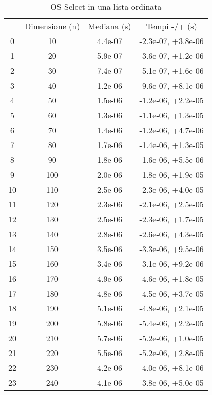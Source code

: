 \begin{table}
\centering
\caption{OS-Select in una lista ordinata}
\label{OS-Select in una lista ordinata}
\begin{adjustbox}{width=1\textwidth/2}
\begin{tabular}{|c|c|c|c|}
\hline
 & Dimensione (n) & Mediana (s) & Tempi -/+ (s) \\
0 & 10 & 4.4e-07 & -2.3e-07, +3.8e-06 \\
\cline{1-4}
1 & 20 & 5.9e-07 & -3.6e-07, +1.2e-06 \\
\cline{1-4}
2 & 30 & 7.4e-07 & -5.1e-07, +1.6e-06 \\
\cline{1-4}
3 & 40 & 1.2e-06 & -9.6e-07, +8.1e-06 \\
\cline{1-4}
4 & 50 & 1.5e-06 & -1.2e-06, +2.2e-05 \\
\cline{1-4}
5 & 60 & 1.3e-06 & -1.1e-06, +1.3e-05 \\
\cline{1-4}
6 & 70 & 1.4e-06 & -1.2e-06, +4.7e-06 \\
\cline{1-4}
7 & 80 & 1.7e-06 & -1.4e-06, +1.3e-05 \\
\cline{1-4}
8 & 90 & 1.8e-06 & -1.6e-06, +5.5e-06 \\
\cline{1-4}
9 & 100 & 2.0e-06 & -1.8e-06, +1.9e-05 \\
\cline{1-4}
10 & 110 & 2.5e-06 & -2.3e-06, +4.0e-05 \\
\cline{1-4}
11 & 120 & 2.3e-06 & -2.1e-06, +2.5e-05 \\
\cline{1-4}
12 & 130 & 2.5e-06 & -2.3e-06, +1.7e-05 \\
\cline{1-4}
13 & 140 & 2.8e-06 & -2.6e-06, +4.3e-05 \\
\cline{1-4}
14 & 150 & 3.5e-06 & -3.3e-06, +9.5e-06 \\
\cline{1-4}
15 & 160 & 3.4e-06 & -3.1e-06, +9.2e-06 \\
\cline{1-4}
16 & 170 & 4.9e-06 & -4.6e-06, +1.8e-05 \\
\cline{1-4}
17 & 180 & 4.8e-06 & -4.5e-06, +3.7e-05 \\
\cline{1-4}
18 & 190 & 5.1e-06 & -4.8e-06, +2.1e-05 \\
\cline{1-4}
19 & 200 & 5.8e-06 & -5.4e-06, +2.2e-05 \\
\cline{1-4}
20 & 210 & 5.7e-06 & -5.2e-06, +1.0e-05 \\
\cline{1-4}
21 & 220 & 5.5e-06 & -5.2e-06, +2.8e-05 \\
\cline{1-4}
22 & 230 & 4.2e-06 & -4.0e-06, +8.1e-06 \\
\cline{1-4}
23 & 240 & 4.1e-06 & -3.8e-06, +5.0e-05 \\

\end{tabular}
\end{adjustbox}
\end{table}
